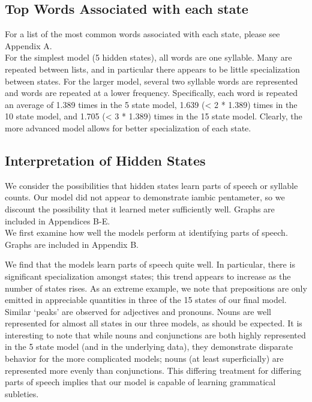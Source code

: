 \subsection{Top Words Associated with each state}
For a list of the most common words associated with each state, please see Appendix A.\\

For the simplest model (5 hidden states), all words are one syllable. Many are repeated between lists, and in particular there appears to be little specialization between states. For the larger model, several two syllable words are represented and words are repeated at a lower frequency. Specifically, each word is repeated an average of 1.389 times in the 5 state model, 1.639 (< 2 * 1.389) times in the 10 state model, and 1.705 (< 3 * 1.389) times in the 15 state model. Clearly, the more advanced model allows for better specialization of each state.

\subsection{Interpretation of Hidden States}
We consider the possibilities that hidden states learn parts of speech or syllable counts. Our model did not appear to demonstrate iambic pentameter, so we discount the possibility that it learned meter sufficiently well. Graphs are included in Appendices B-E.\\

We first examine how well the models perform at identifying parts of speech. Graphs are included in Appendix B.

We find that the models learn parts of speech quite well. In particular, there is significant specialization amongst states; this trend appears to increase as the number of states rises. As an extreme example, we note that prepositions are only emitted in appreciable quantities in three of the 15 states of our final model. Similar `peaks' are observed for adjectives and pronouns. Nouns are well represented for almost all states in our three models, as should be expected. It is interesting to note that while nouns and conjunctions are both highly represented in the 5 state model (and in the underlying data), they demonstrate disparate behavior for the more complicated models; nouns (at least superficially) are represented more evenly than conjunctions. This differing treatment for differing parts of speech implies that our model is capable of learning grammatical subleties.\\

